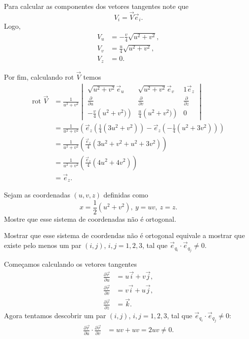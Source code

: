 \documentclass[a4paper,12pt, leqno, answers]{exam}
\newcommand{\devp}[2]{\frac{\partial #1}{\partial #2}}
\newcommand{\rot}{\mbox{rot }}
\begin{document}
\begin{questions}
\begin{solution}
        Para calcular as componentes dos vetores tangentes note que
        \[
        V_i = \vec{V} \vec{e}_i.
        \]
        Logo,
        \begin{align*}
            V_u &= -\frac{v}{4} \sqrt{u^2 + v^2}, \\
            V_v &= \frac{u}{4} \sqrt{u^2 + v^2}, \\
            V_z &= 0.
        \end{align*}
         
        Por fim, calculando $\rot \vec{V}$ temos
        \begin{align*}
            \rot \vec{V} &= \frac{1}{u^2 + v^2} \begin{vmatrix}
                \sqrt{u^2 + v^2} \vec{e}_{u} & \sqrt{u^2 + v^2} \vec{e}_{v} & 1 \vec{e}_{z} \\
                \devp{}{u}      & \devp{}{v}      & \devp{}{z}      \\
                -\frac{v}{4} \left(u^2 + v^2)\right) & \frac{u}{4} \left(u^2 + v^2)\right) & 0           
            \end{vmatrix} \\
            &= \frac{1}{u^2 + v^2} \left(\vec{e}_z \left(\frac{1}{4}\left(3u^2 + v^2\right)\right) - \vec{e}_z \left(-\frac{1}{4}\left(u^2 + 3v^2\right)\right)\right) \\
            &= \frac{1}{u^2 + v^2}\left(\frac{\vec{e}_z}{4}\left(3u^2 + v^2 + u^2 + 3v^2\right)\right) \\
            &= \frac{1}{u^2 + v^2}\left(\frac{\vec{e}_z}{4}\left(4u^2 + 4v^2\right)\right) \\
            &= \vec{e}_z.
        \end{align*}
    \end{solution}
  
    \question Sejam as coordenadas $(u, v, z)$ definidas como
    \[
    x = \frac{1}{2} (u^2 + v^2), \ y = uv, \ z = z.
    \]
    Mostre que esse sistema de coordenadas n\~{a}o \'{e} ortogonal.
    \begin{solution}
        Mostrar que esse sistema de coordendas n\~{a}o \'{e} ortogonal equivale a mostrar que existe pelo menos um par $(i,j)$, $i, j = 1, 2, 3$, tal que $\vec{e}_{q_i} \cdot \vec{e}_{q_j} \neq 0$.
  
        Come\c{c}amos calculando os vetores tangentes
        \begin{align*}
            \devp{\vec{r}}{u} &= u \vec{i} + v \vec{j}, \\
            \devp{\vec{r}}{v} &= v \vec{i} + u \vec{j}, \\
            \devp{\vec{r}}{z} &= \vec{k}.
        \end{align*}
        Agora tentamos descobrir um par $(i,j)$, $i, j = 1, 2, 3$, tal que $\vec{e}_{q_i} \cdot \vec{e}_{q_j} \neq 0$:
        \begin{align*}
            \devp{\vec{r}}{u} \cdot \devp{\vec{r}}{v} &= u v + u v = 2 uv \neq 0.
        \end{align*}
    \end{solution}
  

\end{questions}
\end{document}
